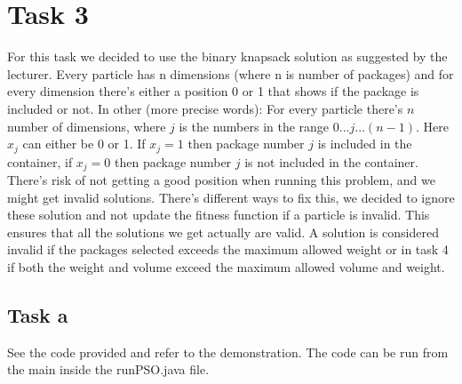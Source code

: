 \documentclass[12pt, a4paper]{article}
\begin{document}
\section{Task 3}\label{3}
For this task we decided to use the binary knapsack solution as suggested by the lecturer. Every particle has n dimensions (where n is number of packages) and for every dimension there's either a position 0 or 1 that shows if the package is included or not.
In other (more precise words):
For every particle there's $n$ number of dimensions, where $j$ is the numbers in the range $0...j...(n-1)$. Here $x_j$ can either be 0 or 1.
If $x_j = 1$ then package number $j$ is included in the container, if $x_j = 0$ then package number $j$ is not included in the container.\\
There's risk of not getting a good position when running this problem, and we might get invalid solutions. There's different ways to fix this, we decided to ignore these solution and not update the fitness function if a particle is invalid. This ensures that all the solutions we get actually are valid. A solution is considered invalid if the packages selected exceeds the maximum allowed weight or in task 4 if both the weight and volume exceed the maximum allowed volume and weight.




\subsection{Task a}
See the code provided and refer to the demonstration.
The code can be run from the main inside the runPSO.java file.
\end{document}
